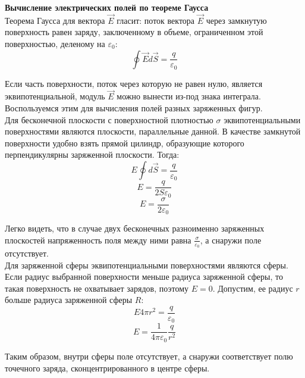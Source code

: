 \documentclass{article}
\begin{document}
	
	\textbf{Вычисление электрических полей по теореме Гаусса}\\

	Теорема Гаусса для вектора $\vec E$ гласит: поток вектора $\vec E$ через замкнутую поверхность равен заряду, заключенному в объеме, ограниченном этой поверхностью, деленому на $\varepsilon_0$:
	\begin{equation}
		\oint{\vec E d\vec S} = \frac{q}{\varepsilon_0}
	\end{equation}

	Если часть поверхности, поток через которую не равен нулю, является эквипотенциальной, модуль $\vec E$ можно вынести из-под знака интеграла. Воспользуемся этим для вычисления полей разных заряженных фигур.\\

	Для бесконечной плоскости с поверхностной плотностью $\sigma$ эквипотенциальными поверхностями являются плоскости, параллельные данной. В качестве замкнутой поверхности удобно взять прямой цилиндр, образующие которого перпендикулярны заряженной плоскости. Тогда:
	\begin{equation}
		E \oint{d \vec S} = \frac{q}{\varepsilon_0}
	\end{equation}
	\begin{equation}
		E = \frac{q}{2S\varepsilon_0}
	\end{equation}
	\begin{equation}
		E = \frac{\sigma}{2\varepsilon_0}
	\end{equation}

	Легко видеть, что в случае двух бесконечных разноименно заряженных плоскостей напряженность поля между ними равна $\frac{\sigma}{\varepsilon_0}$, а снаружи поле отсутствует.\\

	Для заряженной сферы эквипотенциальными поверхностями являются сферы. Если радиус выбранной поверхности меньше радиуса заряженной сферы, то такая поверхность не охватывает зарядов, поэтому $E=0$. Допустим, ее радиус $r$ больше радиуса заряженной сферы $R$:
	\begin{equation}
		E4\pi r^2 = \frac{q}{\varepsilon_0}
	\end{equation}
	\begin{equation}
		E = \frac{1}{4\pi\varepsilon_0}\frac{q}{r^2}
	\end{equation}

	Таким образом, внутри сферы поле отсутствует, а снаружи соответствует полю точечного заряда, сконцентрированного в центре сферы.\\
\end{document}
